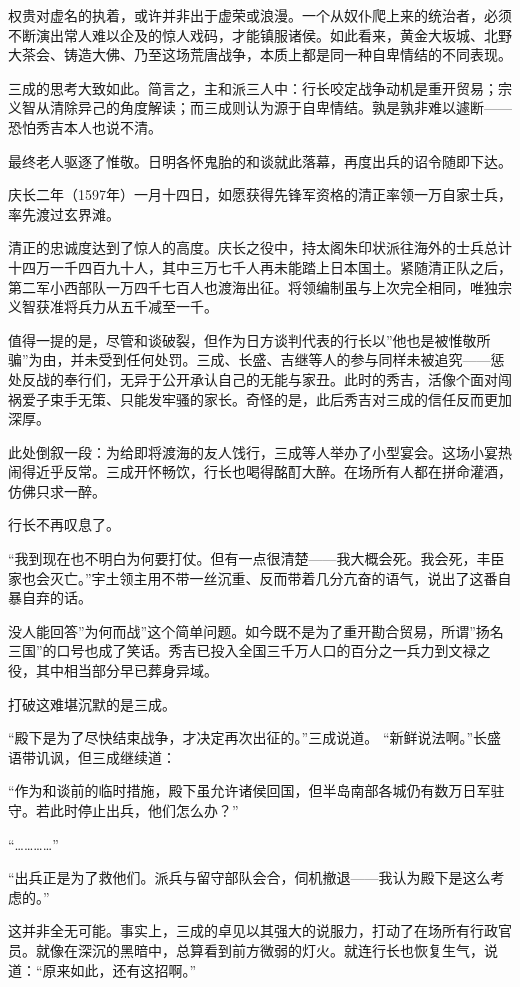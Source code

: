 \documentclass[
]{article}
\begin{document}
权贵对虚名的执着，或许并非出于虚荣或浪漫。一个从奴仆爬上来的统治者，必须不断演出常人难以企及的惊人戏码，才能镇服诸侯。如此看来，黄金大坂城、北野大茶会、铸造大佛、乃至这场荒唐战争，本质上都是同一种自卑情结的不同表现。

三成的思考大致如此。简言之，主和派三人中：行长咬定战争动机是重开贸易；宗义智从清除异己的角度解读；而三成则认为源于自卑情结。孰是孰非难以遽断------恐怕秀吉本人也说不清。

最终老人驱逐了惟敬。日明各怀鬼胎的和谈就此落幕，再度出兵的诏令随即下达。

庆长二年（1597年）一月十四日，如愿获得先锋军资格的清正率领一万自家士兵，率先渡过玄界滩。

清正的忠诚度达到了惊人的高度。庆长之役中，持太阁朱印状派往海外的士兵总计十四万一千四百九十人，其中三万七千人再未能踏上日本国土。紧随清正队之后，第二军小西部队一万四千七百人也渡海出征。将领编制虽与上次完全相同，唯独宗义智获准将兵力从五千减至一千。

值得一提的是，尽管和谈破裂，但作为日方谈判代表的行长以''他也是被惟敬所骗''为由，并未受到任何处罚。三成、长盛、吉继等人的参与同样未被追究------惩处反战的奉行们，无异于公开承认自己的无能与家丑。此时的秀吉，活像个面对闯祸爱子束手无策、只能发牢骚的家长。奇怪的是，此后秀吉对三成的信任反而更加深厚。

此处倒叙一段：为给即将渡海的友人饯行，三成等人举办了小型宴会。这场小宴热闹得近乎反常。三成开怀畅饮，行长也喝得酩酊大醉。在场所有人都在拼命灌酒，仿佛只求一醉。

行长不再叹息了。

``我到现在也不明白为何要打仗。但有一点很清楚------我大概会死。我会死，丰臣家也会灭亡。''宇土领主用不带一丝沉重、反而带着几分亢奋的语气，说出了这番自暴自弃的话。

没人能回答''为何而战''这个简单问题。如今既不是为了重开勘合贸易，所谓''扬名三国''的口号也成了笑话。秀吉已投入全国三千万人口的百分之一兵力到文禄之役，其中相当部分早已葬身异域。

打破这难堪沉默的是三成。

``殿下是为了尽快结束战争，才决定再次出征的。''三成说道。
``新鲜说法啊。''长盛语带讥讽，但三成继续道：

``作为和谈前的临时措施，殿下虽允许诸侯回国，但半岛南部各城仍有数万日军驻守。若此时停止出兵，他们怎么办？''

``\ldots\ldots\ldots\ldots{}''

``出兵正是为了救他们。派兵与留守部队会合，伺机撤退------我认为殿下是这么考虑的。''

这并非全无可能。事实上，三成的卓见以其强大的说服力，打动了在场所有行政官员。就像在深沉的黑暗中，总算看到前方微弱的灯火。就连行长也恢复生气，说道：``原来如此，还有这招啊。''
\end{document}
